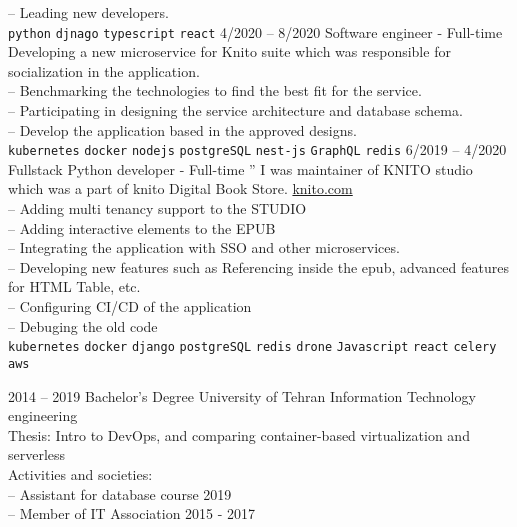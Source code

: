 \documentclass[9pt]{developercv}
\begin{document}
\begin{entrylist}
{		-- Leading new developers. \\
		\texttt{python}\slashsep
		\texttt{djnago}\slashsep
		\texttt{typescript}\slashsep
		\texttt{react}\slashsep
	}
	\entry
	{4/2020 -- 8/2020}
	{Software engineer - Full-time}
	{}
	{
		Developing a new microservice for Knito suite which was responsible for socialization in the application.\\
		-- Benchmarking the technologies to find the best fit for the service. \\
		-- Participating in designing the service architecture and database schema. \\
		-- Develop the application based in the approved designs. \\
		\texttt{kubernetes}\slashsep
		\texttt{docker}\slashsep
		\texttt{nodejs}\slashsep
		\texttt{postgreSQL}\slashsep
		\texttt{nest-js}\slashsep
		\texttt{GraphQL}\slashsep
		\texttt{redis}\slashsep
	}
	\entry
	{6/2019 -- 4/2020}
	{Fullstack Python developer - Full-time}
	{''}
	{
		I was maintainer of KNITO studio which was a part of knito Digital Book Store.
		\href{https://knito.com/}{knito.com} \\
		-- Adding multi tenancy support to the STUDIO \\
		-- Adding interactive elements to the EPUB \\
		-- Integrating the application with SSO and other microservices. \\
		-- Developing new features such as Referencing inside the epub, advanced features for HTML Table, etc. \\
		-- Configuring CI/CD of the application \\
		-- Debuging the old code \\
		\texttt{kubernetes}\slashsep
		\texttt{docker}\slashsep
		\texttt{django}\slashsep
		\texttt{postgreSQL}\slashsep
		\texttt{redis}\slashsep
		\texttt{drone}\slashsep
		\texttt{Javascript}\slashsep
		\texttt{react}\slashsep
		\texttt{celery}\slashsep
		\texttt{aws}\slashsep
	}
\end{entrylist}

\begin{entrylist}
	\entry
	{2014 -- 2019}
	{Bachelor's Degree}
	{University of Tehran}
	{
		Information Technology engineering \\
		Thesis: Intro to DevOps, and comparing container-based virtualization and serverless \\
		Activities and societies: \\
		-- Assistant for database course 2019 \\
		-- Member of IT Association 2015 - 2017 \\
	}
\end{entrylist}
\end{document}
